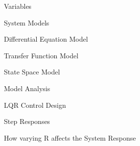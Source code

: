 \documentclass{article}
\begin{document}
\begin{maplelatex}\begin{Maple Bullet Item}{
\underline{}Variables\underline{}}\end{Maple Bullet Item}
\end{maplelatex}
\begin{maplelatex}\begin{Maple Normal}{
System Models}\end{Maple Normal}
\end{maplelatex}
\begin{maplelatex}\begin{Maple Bullet Item}{
\underline{}Differential Equation Model\underline{}}\end{Maple Bullet Item}
\end{maplelatex}
\begin{maplelatex}\begin{Maple Bullet Item}{
\underline{}Transfer Function Model\underline{}\underline{}}\end{Maple Bullet Item}
\end{maplelatex}
\begin{maplelatex}\begin{Maple Bullet Item}{
\underline{}State Space Model\underline{}}\end{Maple Bullet Item}
\end{maplelatex}
\begin{maplelatex}\begin{Maple Bullet Item}{
\underline{}Model Analysis\underline{}}\end{Maple Bullet Item}
\end{maplelatex}
\begin{maplelatex}\begin{Maple Heading 2}{
LQR Control Design}\end{Maple Heading 2}
\end{maplelatex}
\begin{maplelatex}\begin{Maple Bullet Item}{
\underline{}Step Responses\underline{}}\end{Maple Bullet Item}
\end{maplelatex}
\begin{maplelatex}\begin{Maple Bullet Item}{
\underline{}How varying R affects the System Response\underline{}}\end{Maple Bullet Item}
\end{maplelatex}
\begin{maplelatex}\begin{Maple Heading 3}{
\textbf{}}\end{Maple Heading 3}
\end{maplelatex}
\end{document}
